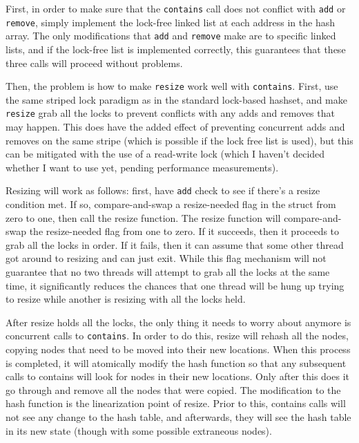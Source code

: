 \documentclass{article}
\begin{document}
First, in order to make sure that the \verb|contains| call does not conflict with \verb|add| or \verb|remove|, simply implement the lock-free linked list at each address in the hash array. The only modifications that \verb|add| and \verb|remove| make are to specific linked lists, and if the lock-free list is implemented correctly, this guarantees that these three calls will proceed without problems.

Then, the problem is how to make \verb|resize| work well with \verb|contains|. First, use the same striped lock paradigm as in the standard lock-based hashset, and make \verb|resize| grab all the locks to prevent conflicts with any adds and removes that may happen. This does have the added effect of preventing concurrent adds and removes on the same stripe (which is possible if the lock free list is used), but this can be mitigated with the use of a read-write lock (which I haven't decided whether I want to use yet, pending performance measurements).

Resizing will work as follows: first, have \verb|add| check to see if there's a resize condition met. If so, compare-and-swap a resize-needed flag in the struct from zero to one, then call the resize function. The resize function will compare-and-swap the resize-needed flag from one to zero. If it succeeds, then it proceeds to grab all the locks in order. If it fails, then it can assume that some other thread got around to resizing and can just exit. While this flag mechanism will not guarantee that no two threads will attempt to grab all the locks at the same time, it significantly reduces the chances that one thread will be hung up trying to resize while another is resizing with all the locks held.

After resize holds all the locks, the only thing it needs to worry about anymore is concurrent calls to \verb|contains|. In order to do this, resize will rehash all the nodes, copying nodes that need to be moved into their new locations. When this process is completed, it will atomically modify the hash function so that any subsequent calls to contains will look for nodes in their new locations. Only after this does it go through and remove all the nodes that were copied. The modification to the hash function is the linearization point of resize. Prior to this, contains calls will not see any change to the hash table, and afterwards, they will see the hash table in its new state (though with some possible extraneous nodes).
\end{document}
